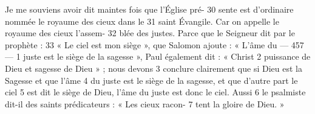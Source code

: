 Je me souviens avoir dit maintes fois que l'Église pré-	 
30	 	sente est d'ordinaire nommée le royaume des cieux dans le	 
31	 	saint Évangile. Car on appelle le royaume des cieux l'assem-	 
32	 	blée des justes. Parce que le Seigneur dit par le prophète :	 
33	 	« Le ciel est mon siège », que Salomon ajoute : « L'âme du	 
 	--- 457 ---	 
1	 	juste est le siège de la sagesse », Paul également dit : « Christ	 
2	 	puissance de Dieu et sagesse de Dieu » ; nous devons	 
3	 	conclure clairement que si Dieu est la Sagesse et que l'âme	 
4	 	du juste est le siège de la sagesse, et que d'autre part le ciel	 
5	 	est dit le siège de Dieu, l'âme du juste est donc le ciel. Aussi	 
6	 	le psalmiste dit-il des saints prédicateurs : « Les cieux racon-	 
7	 	tent la gloire de Dieu. »